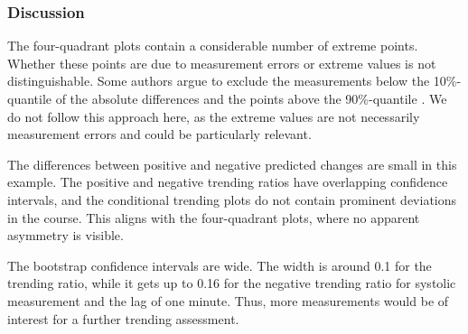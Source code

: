 \subsubsection*{Discussion}

The four-quadrant plots contain a considerable number of extreme points.
Whether these points are due to measurement errors or extreme values is not distinguishable.
Some authors argue to exclude the measurements below the 10\%-quantile of the absolute differences and the points above the 90\%-quantile \parencite[see][]{Critchley2010}.
We do not follow this approach here, as the extreme values are not necessarily measurement errors and could be particularly relevant.

The differences between positive and negative predicted changes are small in this example.
The positive and negative trending ratios have overlapping confidence intervals, and the conditional trending plots do not contain prominent deviations in the course.
This aligns with the four-quadrant plots, where no apparent asymmetry is visible.

The bootstrap confidence intervals are wide.
The width is around 0.1 for the trending ratio, while it gets up to 0.16 for the negative trending ratio for systolic measurement and the lag of one minute.
Thus, more measurements would be of interest for a further trending assessment. 

